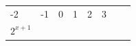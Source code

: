 {\begin{center}
\begin{xtabular*}{\mytablewidth}[t]{|p{10\mystarwidth}|p{10\mystarwidth}|p{10\mystarwidth}|p{10\mystarwidth}|p{10\mystarwidth}|p{10\mystarwidth}|p{10\mystarwidth}|p{10\mystarwidth}|}
        -2 &
    
    
        -1 &
    
    
        0 &
    
    
        1 &
    
    
        2 &
    
    
        3%
     \tabularnewline{}
    
    
        
                \begin{math}{2}^{x+1}\end{math}
               &
    
    
         &
    
    

\end{xtabular*}
\end{center}}
